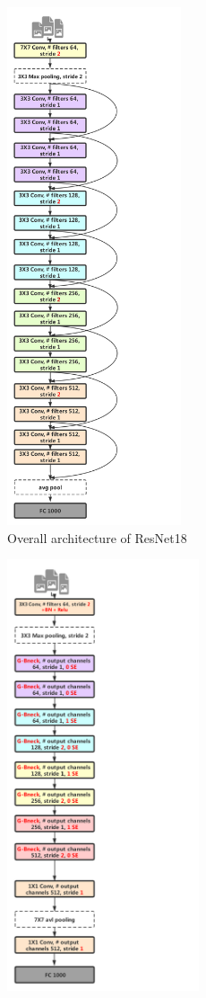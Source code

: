 \begin{figure}[h]
	\begin{center}
		\begin{subfigure}[t]{0.49\textwidth}
		    \centering
			\includegraphics[height=6in]{thesis-template-master/images/res18.pdf}
			\caption{Overall architecture of ResNet18}
			\label{fig:res18}
		\end{subfigure}
		\begin{subfigure}[t]{0.49\textwidth}
		    \centering
			\includegraphics[height =5in]{thesis-template-master/images/Ghostres18.pdf}

\end{subfigure}
\end{center}
\end{figure}
